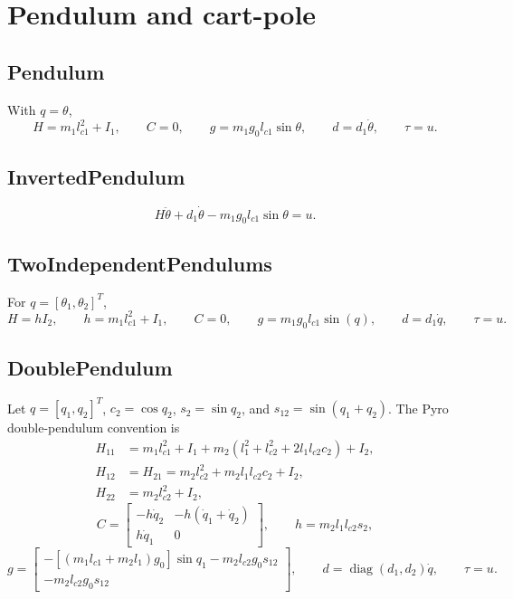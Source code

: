 \documentclass[11pt]{article}
\newcommand{\diag}{\operatorname{diag}}
\begin{document}
\section{Pendulum and cart-pole}

\subsection{Pendulum}
With \(q=\theta\),
\begin{equation}
    H = m_1l_{c1}^2 + I_1,
    \qquad
    C = 0,
    \qquad
    g = m_1g_0l_{c1}\sin\theta,
    \qquad
    d = d_1\dot\theta,
    \qquad
    \tau = u.
\end{equation}

\subsection{InvertedPendulum}
\begin{equation}
    H\ddot\theta + d_1\dot\theta - m_1g_0l_{c1}\sin\theta = u.
\end{equation}

\subsection{TwoIndependentPendulums}
For \(q=[\theta_1,\theta_2]^T\),
\begin{equation}
    H = hI_2,\qquad
    h=m_1l_{c1}^2+I_1,\qquad
    C=0,\qquad
    g=m_1g_0l_{c1}\sin(q),\qquad
    d=d_1\dot q,\qquad
    \tau=u.
\end{equation}

\subsection{DoublePendulum}
Let \(q=[q_1,q_2]^T\), \(c_2=\cos q_2\), \(s_2=\sin q_2\), and
\(s_{12}=\sin(q_1+q_2)\).  The Pyro double-pendulum convention is
\begin{align}
    H_{11} &=
        m_1l_{c1}^2 + I_1
        + m_2(l_1^2+l_{c2}^2+2l_1l_{c2}c_2) + I_2, \\
    H_{12} &= H_{21} =
        m_2l_{c2}^2 + m_2l_1l_{c2}c_2 + I_2, \\
    H_{22} &= m_2l_{c2}^2 + I_2,
\end{align}
\begin{equation}
    C =
    \begin{bmatrix}
        -h\dot q_2 & -h(\dot q_1+\dot q_2) \\
        h\dot q_1 & 0
    \end{bmatrix},
    \qquad
    h=m_2l_1l_{c2}s_2,
\end{equation}
\begin{equation}
    g =
    \begin{bmatrix}
        -[(m_1l_{c1}+m_2l_1)g_0]\sin q_1 - m_2l_{c2}g_0s_{12} \\
        -m_2l_{c2}g_0s_{12}
    \end{bmatrix},
    \qquad
    d=\diag(d_1,d_2)\dot q,
    \qquad
    \tau=u.
\end{equation}
\end{document}
